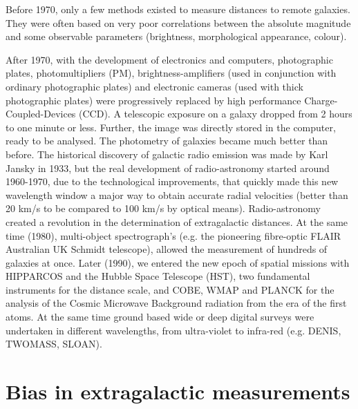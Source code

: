 Before 1970, only a few methods existed to measure distances to remote galaxies. They were often based on very poor correlations between the absolute magnitude and some observable parameters (brightness, morphological appearance, colour).

After 1970, with the development of electronics and computers, photographic plates, photomultipliers (PM), brightness-amplifiers (used in conjunction with ordinary photographic plates) and electronic cameras (used with thick photographic plates) were progressively replaced by  high performance Charge-Coupled-Devices (CCD). A telescopic exposure on a galaxy dropped from 2 hours to one minute or less. Further, the image was directly stored in the computer, ready to be analysed. The photometry of galaxies became much better than before. 
	The historical discovery of galactic radio emission was made by Karl Jansky in 1933, but the real development of radio-astronomy started around 1960-1970, due to the technological improvements, that quickly made this new wavelength window a major way to obtain accurate radial velocities (better than 20 km/s to be compared to 100 km/s by optical means).  Radio-astronomy created a revolution in the determination of extragalactic distances. 
At the same time (1980), multi-object spectrograph's (e.g. the pioneering  fibre-optic FLAIR Australian UK Schmidt telescope), allowed the measurement of hundreds of galaxies at once.
	Later (1990), we entered the new epoch of spatial missions with HIPPARCOS and the Hubble Space Telescope (HST), two fundamental instruments for the distance scale, and COBE, WMAP and PLANCK for the analysis of the Cosmic Microwave Background radiation from the era of the first atoms. At the same time ground based wide or deep digital surveys were undertaken in different wavelengths, from ultra-violet to infra-red (e.g. DENIS, TWOMASS, SLOAN).


\section{Bias in extragalactic measurements}
\label{sec1}

